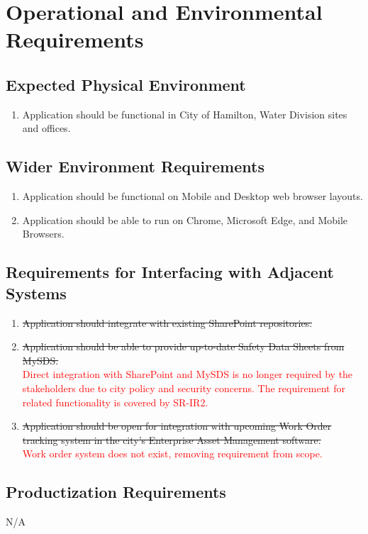 \documentclass[12pt]{article}
\begin{document}
\newpage{}
\section{Operational and Environmental Requirements}
\subsection{Expected Physical Environment}
\begin{enumerate} [{OE-PE}1.]
  \item Application should be functional in City of Hamilton, Water
    Division sites and offices.
\end{enumerate}
\subsection{Wider Environment Requirements}
\begin{enumerate} [{OE-WE}1.]
  \item Application should be functional on Mobile and Desktop web
    browser layouts.
  \item Application should be able to run on Chrome, Microsoft Edge,
    and Mobile Browsers.
\end{enumerate}
\subsection{Requirements for Interfacing with Adjacent Systems}
\begin{enumerate} [{OE-IAS}1.]
  \item \sout{Application should integrate with existing SharePoint
    repositories.}
  \item \sout{Application should be able to provide up-to-date Safety Data
    Sheets from MySDS.}\\
    \textcolor{red}{Direct integration with SharePoint and MySDS is
      no longer required by the stakeholders due to city policy and
      security concerns. The requirement for related functionality is
    covered by SR-IR2.}
  \item \sout{Application should be open for integration with upcoming Work
    Order tracking system in the city's Enterprise Asset Management software.}\\
    \textcolor{red}{Work order system does not exist, removing requirement from scope.}
\end{enumerate}
\subsection{Productization Requirements}
N/A
\end{document}
